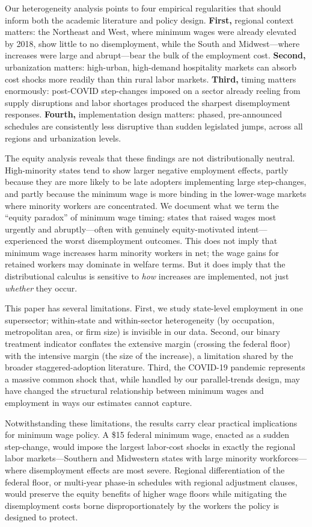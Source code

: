 \documentclass[12pt]{article}
\begin{document}
Our heterogeneity analysis points to four empirical regularities that should
inform both the academic literature and policy design.  \textbf{First,}
regional context matters: the Northeast and West, where minimum wages were
already elevated by 2018, show little to no disemployment, while the South
and Midwest---where increases were large and abrupt---bear the bulk of the
employment cost.  \textbf{Second,} urbanization matters: high-urban, high-demand
hospitality markets can absorb cost shocks more readily than thin rural
labor markets.  \textbf{Third,} timing matters enormously: post-COVID step-changes
imposed on a sector already reeling from supply disruptions and labor shortages
produced the sharpest disemployment responses.  \textbf{Fourth,} implementation
design matters: phased, pre-announced schedules are consistently less
disruptive than sudden legislated jumps, across all regions and urbanization
levels.

The equity analysis reveals that these findings are not distributionally neutral.
High-minority states tend to show larger negative employment effects, partly
because they are more likely to be late adopters implementing large step-changes,
and partly because the minimum wage is more binding in the lower-wage markets
where minority workers are concentrated.  We document what we term the
``equity paradox'' of minimum wage timing: states that raised wages most urgently
and abruptly---often with genuinely equity-motivated intent---experienced
the worst disemployment outcomes.  This does not imply that minimum wage
increases harm minority workers in net; the wage gains for retained workers
may dominate in welfare terms.  But it does imply that the distributional
calculus is sensitive to \emph{how} increases are implemented, not just
\emph{whether} they occur.

This paper has several limitations.  First, we study state-level employment
in one supersector; within-state and within-sector heterogeneity (by
occupation, metropolitan area, or firm size) is invisible in our data.
Second, our binary treatment indicator conflates the extensive margin
(crossing the federal floor) with the intensive margin (the size of the
increase), a limitation shared by the broader staggered-adoption literature.
Third, the COVID-19 pandemic represents a massive common shock that,
while handled by our parallel-trends design, may have changed the structural
relationship between minimum wages and employment in ways our estimates
cannot capture.

Notwithstanding these limitations, the results carry clear practical
implications for minimum wage policy.  A \$15 federal minimum wage, enacted
as a sudden step-change, would impose the largest labor-cost shocks in
exactly the regional labor markets---Southern and Midwestern states with
large minority workforces---where disemployment effects are most severe.
Regional differentiation of the federal floor, or multi-year phase-in
schedules with regional adjustment clauses, would preserve the equity benefits
of higher wage floors while mitigating the disemployment costs borne
disproportionately by the workers the policy is designed to protect.
\end{document}
